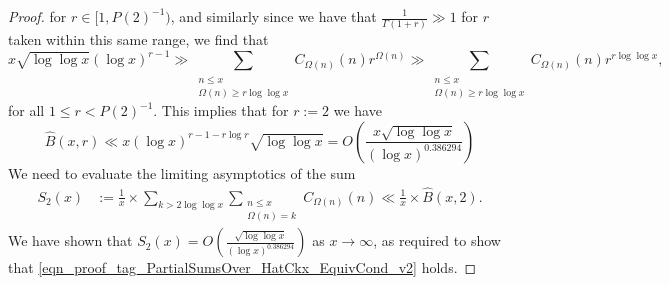 \documentclass[11pt,reqno,a4letter]{article}
\numberwithin{figure}{section}
\numberwithin{table}{section}
\theoremstyle{plain}
\numberwithin{theorem}{section}
\theoremstyle{definition}
\begin{document}
\begin{proof}
for $r \in [1, P(2)^{-1})$, and similarly since we have that 
$\frac{1}{\Gamma(1+r)} \gg 1$ for $r$ taken within this same range, 
we find that 
\[
x \sqrt{\log\log x} (\log x)^{r-1} \gg \sum_{\substack{n \leq x \\ \Omega(n) \geq r\log\log x}} 
     C_{\Omega(n)}(n) r^{\Omega(n)} \gg 
     \sum_{\substack{n \leq x \\ \Omega(n) \geq r\log\log x}} 
     C_{\Omega(n)}(n) r^{r \log\log x},  
\]
for all $1 \leq r < P(2)^{-1}$. 
This implies that for $r := 2$ we have 
\begin{equation}
\label{eqn_BHatxrUpperBound_v1}
\widehat{B}(x, r) \ll x (\log x)^{r-1-r\log r} \sqrt{\log\log x} = 
     O\left(\frac{x \sqrt{\log\log x}}{(\log x)^{0.386294}}\right)
\end{equation}
We need to evaluate the limiting asymptotics of the sum 
\begin{align*}
S_2(x) & := \frac{1}{x} \times 
     \sum_{k > 2\log\log x} \sum_{\substack{n \leq x \\ \Omega(n)=k}} 
     C_{\Omega(n)}(n) \ll \frac{1}{x} \times \widehat{B}(x, 2). 
\end{align*} 
We have shown that 
$S_2(x) = O\left(\frac{\sqrt{\log\log x}}{(\log x)^{0.386294}}\right)$ 
as $x \rightarrow \infty$, as required to show that 
\eqref{eqn_proof_tag_PartialSumsOver_HatCkx_EquivCond_v2} holds. 
\end{proof} 
\end{document}
